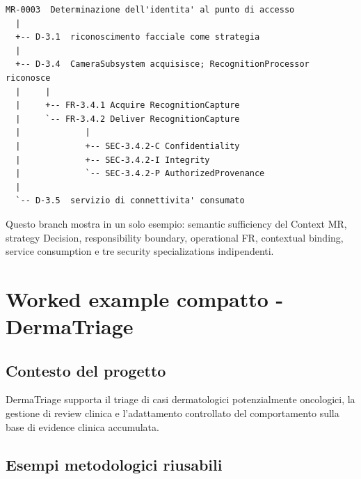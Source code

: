 \documentclass[11pt,a4paper]{article}
\begin{document}
\begin{lstlisting}
MR-0003  Determinazione dell'identita' al punto di accesso
  |
  +-- D-3.1  riconoscimento facciale come strategia
  |
  +-- D-3.4  CameraSubsystem acquisisce; RecognitionProcessor riconosce
  |     |
  |     +-- FR-3.4.1 Acquire RecognitionCapture
  |     `-- FR-3.4.2 Deliver RecognitionCapture
  |             |
  |             +-- SEC-3.4.2-C Confidentiality
  |             +-- SEC-3.4.2-I Integrity
  |             `-- SEC-3.4.2-P AuthorizedProvenance
  |
  `-- D-3.5  servizio di connettivita' consumato
\end{lstlisting}

Questo branch mostra in un solo esempio: semantic sufficiency del Context MR, strategy Decision, responsibility boundary, operational FR, contextual binding, service consumption e tre security specializations indipendenti.

\section{Worked example compatto - DermaTriage}

\subsection{Contesto del progetto}

DermaTriage supporta il triage di casi dermatologici potenzialmente oncologici, la gestione di review clinica e l'adattamento controllato del comportamento sulla base di evidence clinica accumulata.

\subsection{Esempi metodologici riusabili}
\end{document}

